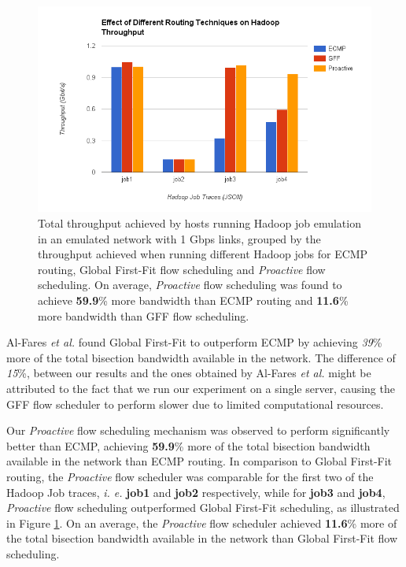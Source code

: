  
\begin{figure}[!ht]
	\centerline{\includegraphics[scale=0.66]{graphics/chapter6/RoutingVThroughput.png}}
	\caption{Total throughput achieved by hosts running Hadoop job emulation in an emulated network with 1 Gbps links, grouped by the throughput achieved when running different Hadoop jobs for ECMP routing, Global First-Fit flow scheduling and \textit{Proactive} flow scheduling. On average, \textit{Proactive} flow scheduling was found to achieve \textbf{59.9}\% more bandwidth than ECMP routing and \textbf{11.6}\% more bandwidth than GFF flow scheduling.}
	\label{fig:RoutingVThroughput}
\end{figure}

Al-Fares \textit{et al.} \cite{al2010hedera} found Global First-Fit to outperform ECMP by achieving \textit{39}\% more of the total bisection bandwidth available in the network. The difference of \textit{15}\%, between our results and the ones obtained by Al-Fares \textit{et al.} might be attributed to the fact that we run our experiment on a single server, causing the GFF flow scheduler to perform slower due to limited computational resources. 

Our \textit{Proactive} flow scheduling mechanism was observed to perform significantly better than ECMP, achieving \textbf{59.9}\% more of the total bisection bandwidth available in the network than ECMP routing. In comparison to Global First-Fit routing, the \textit{Proactive} flow scheduler was comparable for the first two of the Hadoop Job traces, \textit{i. e.} \textbf{job1} and \textbf{job2} respectively, while for \textbf{job3} and \textbf{job4}, \textit{Proactive} flow scheduling outperformed Global First-Fit scheduling, as illustrated in Figure \ref{fig:RoutingVThroughput}. On an average, the \textit{Proactive} flow scheduler achieved \textbf{11.6}\% more of the total bisection bandwidth available in the network than Global First-Fit flow scheduling. 

